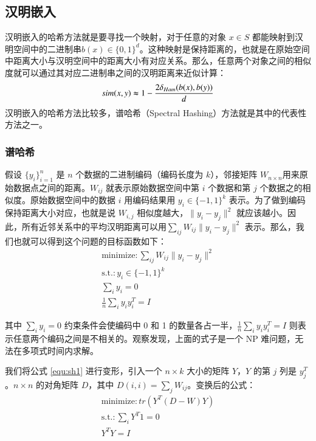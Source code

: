 \subsection{汉明嵌入}
汉明嵌入的哈希方法就是要寻找一个映射，对于任意的对象 $x \in S$ 都能映射到汉明空间中的二进制串$b(x) \in \{0,1\}^d$。这种映射是保持距离的，也就是在原始空间中距离大小与汉明空间中的距离大小有对应关系。那么，任意两个对象之间的相似度就可以通过其对应二进制串之间的汉明距离来近似计算：
\begin{equation}
sim(x, y)\thickapprox 1 - \frac{2\delta_{Ham}(b(x),b(y))}{d}
\end{equation}
汉明嵌入的哈希方法比较多，谱哈希（Spectral Hashing）\cite{WeissTF08}方法就是其中的代表性方法之一。
\subsubsection{谱哈希}
假设 $\{y_i\}^n_{i=1}$ 是 $n$ 个数据的二进制编码（编码长度为 $k$），邻接矩阵 $W_{n\times n}$用来原始数据点之间的距离。$W_{ij}$ 就表示原始数据空间中第 $i$ 个数据和第 $j$ 个数据之的相似度。原始数据空间中的数据 $i$ 用编码结果用 $y_i \in \{-1,1\}^k$ 表示。为了做到编码保持距离大小对应，也就是说 $W_{i,j}$ 相似度越大，$\lVert y_i - y_j \rVert ^2$ 就应该越小。因此，所有近邻关系中的平均汉明距离可以用$\sum_{ij}W_{ij}\lVert y_i - y_j \rVert ^2$ 表示。那么，我们也就可以得到这个问题的目标函数如下：
\begin{equation}
\label{equ:sh1}
\begin{split}
\mathrm{minimize}: \sum_{ij}W_{ij}\lVert y_i - y_j \rVert ^2 \\
\mathrm{s.t.}: y_i \in \{-1,1\}^k \\
\sum_{i} y_i = 0 \\
\frac{1}{n}\sum_{i}y_iy_i^T = I
\end{split}
\end{equation}

其中 $\sum_{i} y_i = 0$ 约束条件会使编码中 0 和 1 的数量各占一半，$\frac{1}{n}\sum_{i}y_iy_i^T = I $ 则表示任意两个编码之间是不相关的。观察发现，上面的式子是一个 NP 难问题，无法在多项式时间内求解。

我们将公式 \ref{equ:sh1} 进行变形，引入一个 $n\times k$ 大小的矩阵 $Y$，$Y$ 的第 $j$ 列是 $y_j^T$ 。$n\times n$ 的对角矩阵 $D$，其中 $D(i,i)=\sum_{j}W_{ij}$。变换后的公式：
\begin{equation}
\label{equ:sh2}
\begin{split}
\mathrm{minimize}: tr(Y^T(D-W)Y)\\
\mathrm{s.t.}: \sum_{i} Y^T1= 0 \\
Y^TY = I
\end{split}
\end{equation}

